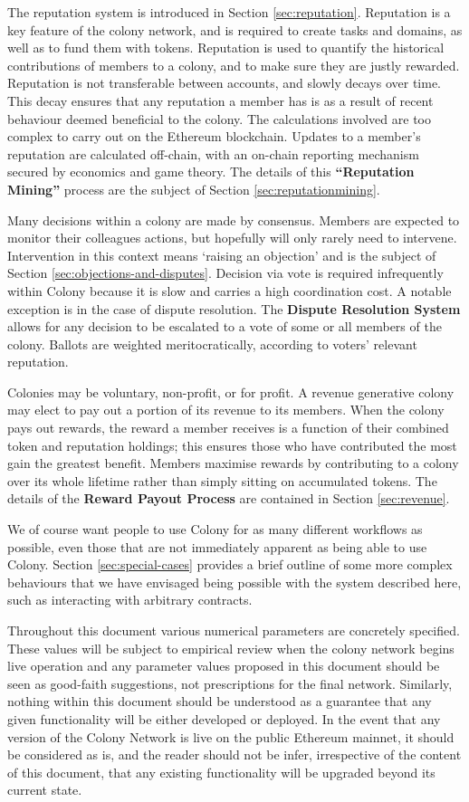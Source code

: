 The reputation system is introduced in Section \ref{sec:reputation}. Reputation is a key feature of the colony network, and is required to create tasks and domains, as well as to fund them with tokens. Reputation is used to quantify the historical contributions of members to a colony, and to make sure they are justly rewarded. Reputation is not transferable between accounts, and slowly decays over time. This decay ensures that any reputation a member has is as a result of recent behaviour deemed beneficial to the colony. The calculations involved are too complex to carry out on the Ethereum blockchain. Updates to a member's reputation are calculated off-chain, with an on-chain reporting mechanism secured by economics and game theory. The details of this \textbf{``Reputation Mining''} process are the subject of Section \ref{sec:reputationmining}.

Many decisions within a colony are made by consensus. Members are expected to monitor their colleagues actions, but hopefully will only rarely need to intervene. Intervention in this context means `raising an objection' and is the subject of Section \ref{sec:objections-and-disputes}. Decision via vote is required infrequently within Colony because it is slow and carries a high coordination cost. A notable exception is in the case of dispute resolution. The \textbf{Dispute Resolution System} allows for any decision to be escalated to a vote of some or all members of the colony. Ballots are weighted meritocratically, according to voters' relevant reputation.

Colonies may be voluntary, non-profit, or for profit. A revenue generative colony may elect to pay out a portion of its revenue to its members. When the colony pays out rewards, the reward a member receives is a function of their combined token and reputation holdings; this ensures those who have contributed the most gain the greatest benefit. Members maximise rewards by contributing to a colony over its whole lifetime rather than simply sitting on accumulated tokens. The details of the \textbf{Reward Payout Process} are contained in Section \ref{sec:revenue}.

We of course want people to use Colony for as many different workflows as possible, even those that are not immediately apparent as being able to use Colony. Section \ref{sec:special-cases} provides a brief outline of some more complex behaviours that we have envisaged being possible with the system described here, such as interacting with arbitrary contracts.

Throughout this document various numerical parameters are concretely specified. These values will be subject to empirical review when the colony network begins live operation and any parameter values proposed in this document should be seen as good-faith suggestions, not prescriptions for the final network. Similarly, nothing within this document should be understood as a guarantee that any given functionality will be either developed or deployed. In the event that any version of the Colony Network is live on the public Ethereum mainnet, it should be considered as is, and the reader should not be infer, irrespective of the content of this document, that any existing functionality will be upgraded beyond its current state.
